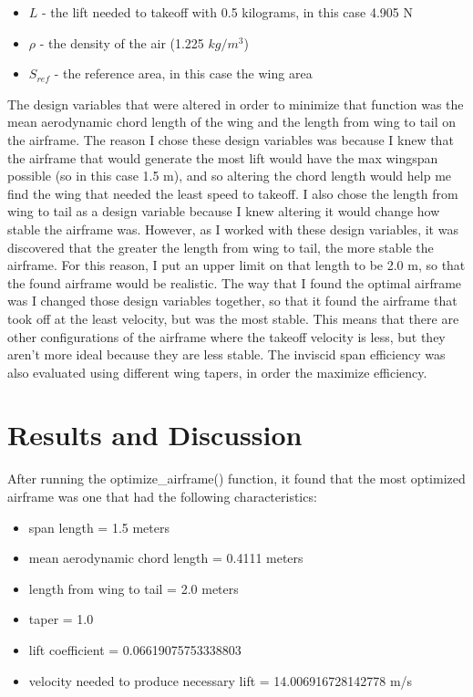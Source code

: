\documentclass{journal}
\begin{document}
	\begin{itemize}
		\item \(L\) - the lift needed to takeoff with 0.5 kilograms, in this case 4.905 N
		\item \(\rho\) - the density of the air (1.225 \(kg/m^3\))
		\item \(S_{ref}\) - the reference area, in this case the wing area
	\end{itemize}
	
	The design variables that were altered in order to minimize that function was the mean aerodynamic chord length of the wing and the length from wing to tail on the airframe. The reason I chose these design variables was because I knew that the airframe that would generate the most lift would have the max wingspan possible (so in this case 1.5 m), and so altering the chord length would help me find the wing that needed the least speed to takeoff. I also chose the length from wing to tail as a design variable because I knew altering it would change how stable the airframe was. However, as I worked with these design variables, it was discovered that the greater the length from wing to tail, the more stable the airframe. For this reason, I put an upper limit on that length to be 2.0 m, so that the found airframe would be realistic. The way that I found the optimal airframe was I changed those design variables together, so that it found the airframe that took off at the least velocity, but was the most stable. This means that there are other configurations of the airframe where the takeoff velocity is less, but they aren't more ideal because they are less stable. The inviscid span efficiency was also evaluated using different wing tapers, in order the maximize efficiency.
		
	\section{Results and Discussion}
	
	After running the optimize\_airframe() function, it found that the most optimized airframe was one that had the following characteristics:
	
	\begin{itemize}
		\item span length = 1.5 meters
		\item mean aerodynamic chord length = 0.4111 meters
		\item length from wing to tail = 2.0 meters
		\item taper = 1.0
		\item lift coefficient = 0.06619075753338803
		\item velocity needed to produce necessary lift = 14.006916728142778 m/s
	\end{itemize}
\end{document}
